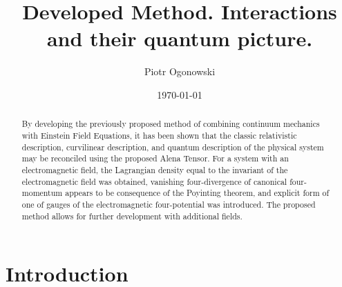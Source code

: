 \documentclass[aps,prx,preprint,groupedaddress,showkeys]{revtex4-2}
\begin{document}
\title{Developed Method. Interactions and their quantum picture.}
\author{Piotr Ogonowski}


\date{\today}

\begin{abstract}
By developing the previously proposed method of combining continuum mechanics with Einstein Field Equations, it has been shown that the classic relativistic description, curvilinear description, and quantum description of the physical system may be reconciled using the proposed Alena Tensor. For a system with an electromagnetic field, the Lagrangian density equal to the invariant of the electromagnetic field was obtained, vanishing four-divergence of canonical four-momentum appears to be consequence of the Poyinting theorem, and explicit form of one of gauges of the electromagnetic four-potential was introduced. The proposed method allows for further development with additional fields.
\end{abstract}


\maketitle

\section{Introduction}
\end{document}
